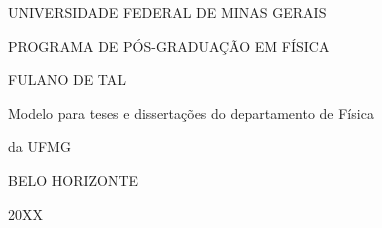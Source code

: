 \pretextual

\centerline{\large UNIVERSIDADE FEDERAL DE MINAS GERAIS}
\centerline{\large PROGRAMA DE PÓS-GRADUAÇÃO EM FÍSICA}

\vspace{5cm}

\centerline{\large FULANO DE TAL}

\vspace{5.5cm}

\centerline{\Large Modelo para teses e dissertações do departamento de Física}
\centerline{\Large da UFMG}

\vspace{10cm}


\centerline{\large BELO HORIZONTE}
\centerline{\large 20XX}
\newpage


\imprimirfolhaderosto*


%
\begin{fichacatalografica}
    
\end{fichacatalografica}


%
\begin{folhadeaprovacao}
     
     \end{folhadeaprovacao}

